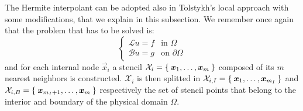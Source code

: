 The Hermite interpolant can be adopted also in Tolstykh's local approach with some modifications, that we explain in this subsection.
We remember once again that the problem that has to be solved is:
\begin{equation}
	\label{eqn:boundary_value_problem_RBF-HFD}
	\begin{cases}
		\mathcal{L} u  = f 		 & \text{in $\Omega$} \\
		\mathcal{B} u   = g	     & \text{on $\partial\Omega$}
	\end{cases}
\end{equation}
and for each internal node $\vec{x}_i$ a stencil $\mathcal{X}_i = \Set{\boldsymbol{x}_1, \dots, \boldsymbol{x}_m}$ composed of its $m$ nearest neighbors is constructed. $\mathcal{X}_i$ is then splitted in $\mathcal{X}_{i,I} = \Set{\boldsymbol{x}_1, \dots, \boldsymbol{x}_{m_I}}$ and $\mathcal{X}_{i,B} = \Set{\boldsymbol{x}_{m_I+1}, \dots, \boldsymbol{x}_{m}}$ respectively the set of stencil points that belong to the interior and boundary of the physical domain $\Omega$.


